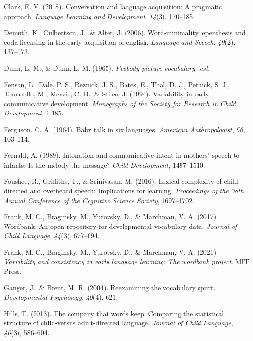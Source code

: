 \documentclass[10pt, letterpaper]{article}
\newenvironment{CSLReferences}%
  {}%
  {\par}
\begin{document}
\begin{CSLReferences}
\leavevmode\hypertarget{ref-clark2018conversation}{}%
Clark, E. V. (2018). Conversation and language acquisition: A pragmatic
approach. \emph{Language Learning and Development}, \emph{14}(3),
170--185.

\leavevmode\hypertarget{ref-demuth2006word}{}%
Demuth, K., Culbertson, J., \& Alter, J. (2006). Word-minimality,
epenthesis and coda licensing in the early acquisition of english.
\emph{Language and Speech}, \emph{49}(2), 137--173.

\leavevmode\hypertarget{ref-dunn1965peabody}{}%
Dunn, L. M., \& Dunn, L. M. (1965). \emph{Peabody picture vocabulary
test}.

\leavevmode\hypertarget{ref-fenson1994variability}{}%
Fenson, L., Dale, P. S., Reznick, J. S., Bates, E., Thal, D. J.,
Pethick, S. J., Tomasello, M., Mervis, C. B., \& Stiles, J. (1994).
Variability in early communicative development. \emph{Monographs of the
Society for Research in Child Development}, i--185.

\leavevmode\hypertarget{ref-ferguson1964baby}{}%
Ferguson, C. A. (1964). Baby talk in six languages. \emph{American
Anthropologist}, \emph{66}, 103--114.

\leavevmode\hypertarget{ref-fernald1989intonation}{}%
Fernald, A. (1989). Intonation and communicative intent in mothers'
speech to infants: Is the melody the message? \emph{Child Development},
1497--1510.

\leavevmode\hypertarget{ref-foushee2016lexical}{}%
Foushee, R., Griffiths, T., \& Srinivasan, M. (2016). Lexical complexity
of child-directed and overheard speech: Implications for learning.
\emph{Proceedings of the 38th Annual Conference of the Cognitive Science
Society}, 1697--1702.

\leavevmode\hypertarget{ref-frank2017wordbank}{}%
Frank, M. C., Braginsky, M., Yurovsky, D., \& Marchman, V. A. (2017).
Wordbank: An open repository for developmental vocabulary data.
\emph{Journal of Child Language}, \emph{44}(3), 677--694.

\leavevmode\hypertarget{ref-frank2021variability}{}%
Frank, M. C., Braginsky, M., Yurovsky, D., \& Marchman, V. A. (2021).
\emph{Variability and consistency in early language learning: The
wordbank project}. MIT Press.

\leavevmode\hypertarget{ref-ganger2004reexamining}{}%
Ganger, J., \& Brent, M. R. (2004). Reexamining the vocabulary spurt.
\emph{Developmental Psychology}, \emph{40}(4), 621.

\leavevmode\hypertarget{ref-hills2013company}{}%
Hills, T. (2013). The company that words keep: Comparing the statistical
structure of child-versus adult-directed language. \emph{Journal of
Child Language}, \emph{40}(3), 586--604.


\end{CSLReferences}
\end{document}
